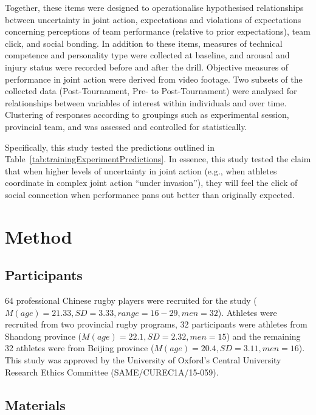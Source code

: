 \begin{CJK}{UTF8}{gbsn}
Together, these items were designed to operationalise hypothesised relationships between uncertainty in joint action, expectations and violations of expectations concerning perceptions of team performance (relative to prior expectations), team click, and social bonding.  In addition to these items, measures of technical competence and personality type were collected at baseline, and arousal and injury status were recorded before and after the drill.  Objective measures of performance in joint action were derived from video footage.  Two subsets of the collected data (Post-Tournament, Pre- to Post-Tournament) were analysed for relationships between variables of interest within individuals and over time.  Clustering of responses according to groupings such as experimental session, provincial team, and was assessed and controlled for statistically.

Specifically, this study tested the predictions outlined in Table~\ref{tab:trainingExperimentPredictions}.  In essence, this study tested the claim that when higher levels of uncertainty in joint action (e.g., when athletes coordinate in complex joint action ``under invasion''), they will feel the click of social connection when performance pans out better than originally expected.







\clearpage
\section{Method}

\subsection{Participants}
64 professional Chinese rugby players were recruited for the study ($M(age) = 21.33, SD = 3.33, range = 16-29, men = 32$).  Athletes were recruited from two provincial rugby programs, 32
participants were athletes from Shandong province ($M(age) = 22.1, SD = 2.32, men = 15$) and the remaining 32 athletes were from Beijing province ($M(age) = 20.4, SD = 3.11, men = 16$).  This study was approved by the University of Oxford's Central University Research Ethics Committee (SAME/CUREC1A/15-059).


\subsection{Materials}



\end{CJK}
